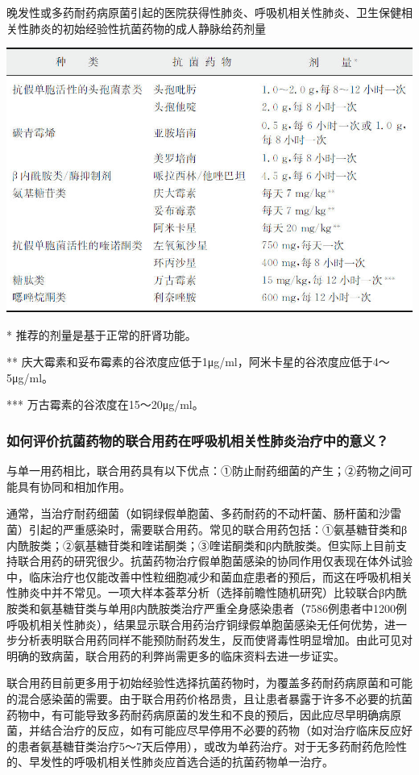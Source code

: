 \begin{table}[htbp]
\centering
\caption{晚发性或多药耐药病原菌引起的医院获得性肺炎、呼吸机相关性肺炎、卫生保健相关性肺炎的初始经验性抗菌药物的成人静脉给药剂量}
\label{tab8-8}
\includegraphics{./images/Image00068.jpg}
\end{table}

* 推荐的剂量是基于正常的肝肾功能。

**
庆大霉素和妥布霉素的谷浓度应低于1μg/ml，阿米卡星的谷浓度应低于4～5μg/ml。

*** 万古霉素的谷浓度在15～20μg/ml。

\subsubsection{如何评价抗菌药物的联合用药在呼吸机相关性肺炎治疗中的意义？}

与单一用药相比，联合用药具有以下优点：①防止耐药细菌的产生；②药物之间可能具有协同和相加作用。

通常，当治疗耐药细菌（如铜绿假单胞菌、多药耐药的不动杆菌、肠杆菌和沙雷菌）引起的严重感染时，需要联合用药。常见的联合用药包括：①氨基糖苷类和β内酰胺类；②氨基糖苷类和喹诺酮类；③喹诺酮类和β内酰胺类。但实际上目前支持联合用药的研究很少。抗菌药物治疗假单胞菌感染的协同作用仅表现在体外试验中，临床治疗也仅能改善中性粒细胞减少和菌血症患者的预后，而这在呼吸机相关性肺炎中并不常见。一项大样本荟萃分析（选择前瞻性随机研究）比较联合β内酰胺类和氨基糖苷类与单用β内酰胺类治疗严重全身感染患者（7586例患者中1200例呼吸机相关性肺炎），结果显示联合用药治疗铜绿假单胞菌感染无任何优势，进一步分析表明联合用药同样不能预防耐药发生，反而使肾毒性明显增加。由此可见对明确的致病菌，联合用药的利弊尚需更多的临床资料去进一步证实。

联合用药目前更多用于初始经验性选择抗菌药物时，为覆盖多药耐药病原菌和可能的混合感染菌的需要。由于联合用药价格昂贵，且让患者暴露于许多不必要的抗菌药物中，有可能导致多药耐药病原菌的发生和不良的预后，因此应尽早明确病原菌，并结合治疗的反应，如有可能应尽早停用不必要的药物（如对治疗临床反应好的患者氨基糖苷类治疗5～7天后停用），或改为单药治疗。对于无多药耐药危险性的、早发性的呼吸机相关性肺炎应首选合适的抗菌药物单一治疗。

